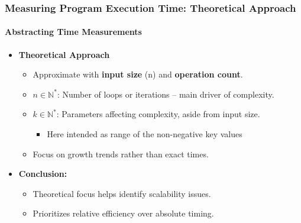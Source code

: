 \documentclass[compress,12pt]{beamer}
\begin{document}
\begin{frame}
    \frametitle{Measuring Program Execution Time: Theoretical Approach}
    \framesubtitle{Abstracting Time Measurements}

    \begin{itemize}
        \item \textbf{Theoretical Approach}
              \begin{itemize}
                  \item Approximate with \textbf{input size} (n) and \textbf{operation count}.
                  \item $n \in \mathbb{N}^*$: Number of loops or iterations -- main driver of complexity.
                  \item $k \in \mathbb{N}^*$: Parameters affecting complexity, aside from input size.
                        \begin{itemize}
                            \item Here intended as range of the non-negative key values
                        \end{itemize}
                  \item Focus on growth trends rather than exact times.
              \end{itemize}
        \item \textbf{Conclusion:}
              \begin{itemize}
                  \item Theoretical focus helps identify scalability issues.
                  \item Prioritizes relative efficiency over absolute timing.
              \end{itemize}
    \end{itemize}
\end{frame}
\end{document}
